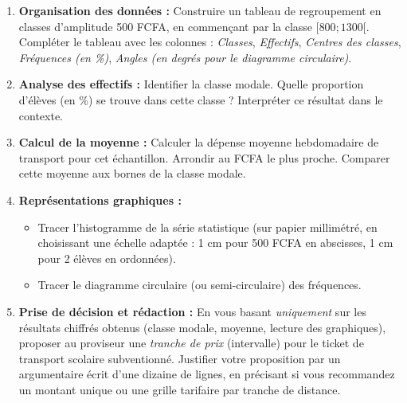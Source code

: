 \documentclass[11pt]{article}
\newcommand{\cle}[1]{{\popxbold\color{popdark}#1}}
\begin{document}
\begin{enumerate}
    \item \textbf{Organisation des données :} Construire un tableau de regroupement en classes d'amplitude 500 FCFA, en commençant par la classe $[800 ; 1300[$. Compléter le tableau avec les colonnes : \emph{Classes}, \emph{Effectifs}, \emph{Centres des classes}, \emph{Fréquences (en \%)}, \emph{Angles (en degrés pour le diagramme circulaire)}.
    \item \textbf{Analyse des effectifs :} Identifier la \cle{classe modale}. Quelle proportion d'élèves (en \%) se trouve dans cette classe ? Interpréter ce résultat dans le contexte.
    \item \textbf{Calcul de la moyenne :} Calculer la dépense moyenne hebdomadaire de transport pour cet échantillon. Arrondir au FCFA le plus proche. Comparer cette moyenne aux bornes de la classe modale.
    \item \textbf{Représentations graphiques :}
    \begin{itemize}
        \item Tracer l'\cle{histogramme} de la série statistique (sur papier millimétré, en choisissant une échelle adaptée : 1 cm pour 500 FCFA en abscisses, 1 cm pour 2 élèves en ordonnées).
        \item Tracer le \cle{diagramme circulaire} (ou semi-circulaire) des fréquences.
    \end{itemize}
    \item \textbf{Prise de décision et rédaction :} En vous basant \emph{uniquement} sur les résultats chiffrés obtenus (classe modale, moyenne, lecture des graphiques), proposer au proviseur une \emph{tranche de prix} (intervalle) pour le ticket de transport scolaire subventionné. Justifier votre proposition par un argumentaire écrit d'une dizaine de lignes, en précisant si vous recommandez un montant unique ou une grille tarifaire par tranche de distance.
\end{enumerate}
\end{document}
